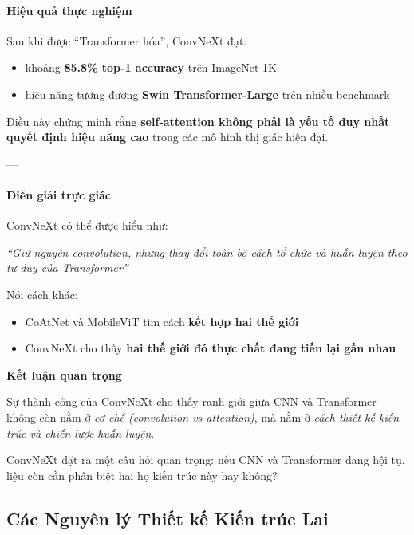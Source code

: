 \paragraph{Hiệu quả thực nghiệm}

Sau khi được “Transformer hóa”, ConvNeXt đạt:
\begin{itemize}
	\item khoảng \textbf{85.8\% top-1 accuracy} trên ImageNet-1K
	\item hiệu năng tương đương \textbf{Swin Transformer-Large} trên nhiều benchmark
\end{itemize}

Điều này chứng minh rằng \textbf{self-attention không phải là yếu tố duy nhất quyết định hiệu năng cao} trong các mô hình thị giác hiện đại.

---

\paragraph{Diễn giải trực giác}

ConvNeXt có thể được hiểu như:

\begin{center}
	\textit{“Giữ nguyên convolution, nhưng thay đổi toàn bộ cách tổ chức và huấn luyện theo tư duy của Transformer”}
\end{center}

Nói cách khác:
\begin{itemize}
	\item CoAtNet và MobileViT tìm cách \textbf{kết hợp hai thế giới}
	\item ConvNeXt cho thấy \textbf{hai thế giới đó thực chất đang tiến lại gần nhau}
\end{itemize}

\begin{mdframed}[style=infobox]
	\textbf{Kết luận quan trọng}
	
	Sự thành công của ConvNeXt cho thấy ranh giới giữa CNN và Transformer không còn nằm ở \textit{cơ chế (convolution vs attention)},  
	mà nằm ở \textit{cách thiết kế kiến trúc và chiến lược huấn luyện}.
\end{mdframed}

ConvNeXt đặt ra một câu hỏi quan trọng: nếu CNN và Transformer đang hội tụ, liệu còn cần phân biệt hai họ kiến trúc này hay không?

\subsection{Các Nguyên lý Thiết kế Kiến trúc Lai}

